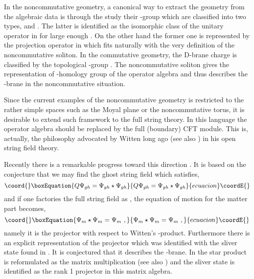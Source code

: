 \documentclass[a4paper,12pt]{article}
\begin{document}
In the noncommutative geometry, a canonical way to extract the geometry
from the algebraic data is through the study their \coordHE{}-group
\cite{r-Connes, r-WO} which are classified into
two types, \coordHE{} and \coordHE{}.  The latter is
identified as the isomorphic class of the unitary operator in
\coordHE{} for large enough 
\coordHE{}.  On the other hand 
the former one is represented by the projection operator 
in \coordHE{}
which fits naturally with the very definition 
of the noncommutative soliton.
In the commutative geometry, the D-brane charge is
classified by the topological \coordHE{}-group
\cite{r-Witten1, r-Horava}.  The noncommutative
soliton gives the representation of \coordHE{}-homology group of the
operator algebra and thus describes the \coordHE{}-brane
in the noncommutative situation\cite{r-Matsuo, r-HM}.

Since the current examples of the noncommutative geometry
is restricted to the rather simple spaces such as
the Moyal plane or the noncommutative torus, it is desirable
to extend such framework to the full string theory. 
In this language the operator algebra \coordHE{} should be
replaced by the full (boundary) CFT module.
This is, actually, the philosophy advocated by Witten
long ago \cite{r-Witten} (see also \cite{r-Witten2}) in his 
open string field theory.

Recently there is a remarkable progress toward this direction
\cite{r-RZ,r-KP, r-RSZ, r-RSZ1, r-RSZ2, r-GT}. It is based on the
conjecture that we may find the ghost string field which satisfies,
\begin{equation}\coord{}\boxEquation{
 Q\Psi_{gh}=\Psi_{gh}\star \Psi_{gh}
}{
 Q\Psi_{gh}=\Psi_{gh}\star \Psi_{gh}
}{ecuacion}\coordE{}\end{equation}
and if one factories the full string field as
\coordHE{}, the equation of
motion for the matter part becomes,
\begin{equation}\coord{}\boxEquation{\label{e-projector}
 \Psi_m\star \Psi_m = \Psi_m\,\,,
}{\Psi_m\star \Psi_m = \Psi_m\,\,,
}{ecuacion}\coordE{}\end{equation}
namely it is the projector with respect to Witten's \myHighlight{$\star$}\coordHE{}-product.
Furthermore there is an explicit representation of
the projector \cite{r-KP} which was identified with the 
sliver state found in \cite{r-RZ}.  It is conjectured that
it describes  the \coordHE{}-brane. In \cite{r-RSZ2,r-GT} the
star product is reformulated as the matrix multiplication
(see also \cite{r-Witten}) and the sliver state is identified as the
rank 1 projector in this matrix algebra.
\end{document}
